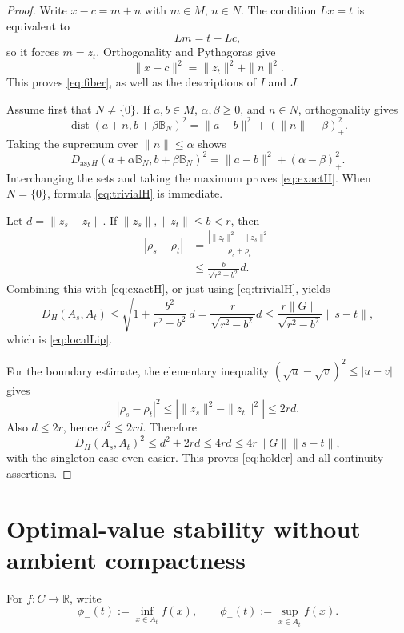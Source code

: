 \documentclass[11pt]{article}
\newcommand{\R}{\mathbb R}
\newcommand{\B}{\mathbb B}
\newcommand{\dist}{\operatorname{dist}}
\begin{document}
\begin{proof}
Write $x-c=m+n$ with $m\in M$, $n\in N$.  The condition $Lx=t$
is equivalent to
\[
 Lm=t-Lc,
\]
so it forces $m=z_t$.  Orthogonality and Pythagoras give
\[
 \|x-c\|^2=\|z_t\|^2+\|n\|^2.
\]
This proves \eqref{eq:fiber}, as well as the descriptions of $I$ and $J$.

Assume first that $N\ne\{0\}$.  If $a,b\in M$, $\alpha,\beta\ge0$,
and $n\in N$, orthogonality gives
\begin{equation}\label{eq:pointdist}
 \dist(a+n,b+\beta\B_N)^2
 =\|a-b\|^2+(\|n\|-\beta)_+^2.
\end{equation}
Taking the supremum over $\|n\|\le\alpha$ shows
\[
 D_{\mathrm{asy}H}(a+\alpha\B_N,b+\beta\B_N)^2
 =\|a-b\|^2+(\alpha-\beta)_+^2.
\]
Interchanging the sets and taking the maximum proves \eqref{eq:exactH}.
When $N=\{0\}$, formula \eqref{eq:trivialH} is immediate.

Let $d=\|z_s-z_t\|$.  If $\|z_s\|,\|z_t\|\le b<r$, then
\begin{align*}
 |\rho_s-\rho_t|
 &=\frac{|\|z_t\|^2-\|z_s\|^2|}{\rho_s+\rho_t}\\
 &\le \frac{b}{\sqrt{r^2-b^2}}d.
\end{align*}
Combining this with \eqref{eq:exactH}, or just using
\eqref{eq:trivialH}, yields
\[
 D_H(A_s,A_t)\le
 \sqrt{1+\frac{b^2}{r^2-b^2}}\,d
 =\frac r{\sqrt{r^2-b^2}}d
 \le\frac{r\|G\|}{\sqrt{r^2-b^2}}\|s-t\|,
\]
which is \eqref{eq:localLip}.

For the boundary estimate, the elementary inequality
$(\sqrt u-\sqrt v)^2\le|u-v|$ gives
\[
 |\rho_s-\rho_t|^2
 \le |\|z_s\|^2-\|z_t\|^2|
 \le 2r d.
\]
Also $d\le2r$, hence $d^2\le2rd$.  Therefore
\[
 D_H(A_s,A_t)^2\le d^2+2rd\le4rd
 \le4r\|G\|\|s-t\|,
\]
with the singleton case even easier.  This proves \eqref{eq:holder} and all
continuity assertions.
\end{proof}

\section{Optimal-value stability without ambient compactness}

For $f:C\to\R$, write
\[
 \phi_-(t):=\inf_{x\in A_t}f(x),\qquad
 \phi_+(t):=\sup_{x\in A_t}f(x).
\]
\end{document}
